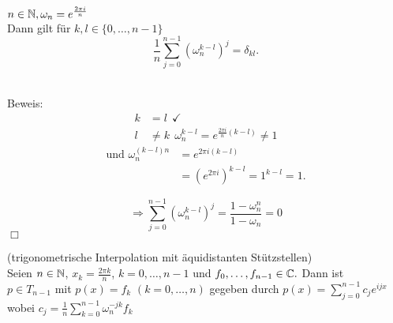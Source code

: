 \begin{Lemma} 
$n \in \mathbb N, \omega_n = e^{\frac{2 \pi i}{n}} $ \\
Dann gilt für $k,l \in \{0, \dots, n-1\}$ \\
\[ \frac{1}{n} \sum_{j=0}^{n-1} (\omega_n^{k-l})^j = \delta_{kl}. \] \\
\end{Lemma}

Beweis: 
\begin{align*}
k&= l~~ \checkmark \\
l &\neq k ~~ \omega_n^{k-l} = e^{\frac{2 \pi i}{n}(k-l)} \neq 1
\end{align*}
\begin{align*}
\text{und } \omega_n^{(k-l)n} &= e^{2 \pi i (k-l)} \\
&= (e^{2 \pi i})^{k-l} = 1^{k-l} = 1.
\end{align*}

\[ \Rightarrow \sum_{j=0}^{n-1} (\omega_n^{k-l})^j = 
\frac{1-\omega_n^n}{1-\omega_n} = 0 \]   \hfill $\Box$ 

\begin{Satz} (trigonometrische Interpolation mit äquidistanten 
Stützstellen) \\
Seien $n \in \mathbb N$, $x_k = \frac{2 \pi k}{n}$, $k = 0, \dots, n-1$ 
und $f_0, \dots, f_{n-1} \in \mathbb C.$ Dann ist \\
$p \in T_{n-1}$ mit $p(x) = f_k$ $(k=0,\dots, n)$ 
gegeben durch $p(x) = \sum_{j=0}^{n-1} c_j e^{ijx}$ \\
wobei $c_j = \frac{1}{n} \sum_{k=0}^{n-1} \omega_n^{-jk} f_k$

\end{Satz}
